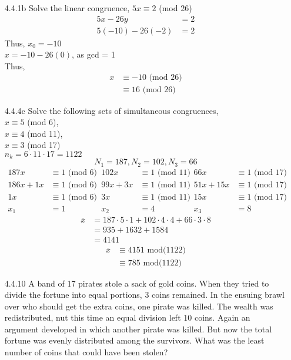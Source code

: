 \documentclass[12pt]{article}
\begin{document}
\begin{enumerate}
	\item[4.4.1b] Solve the linear congruence, $ 5x\equiv 2 $ (mod 26)
	\begin{align*}
		5x-26y&=2\\
		5(-10)-26(-2)&=2
	\end{align*}
	Thus, $ x_0 = -10 $\\
	$ x = -10 - 26(0) $, as gcd = 1\\
	Thus, \begin{align*}
		x &\equiv -10 \text { (mod 26)}\\
		  &\equiv 16 \text{ (mod 26)}
	\end{align*}
	\item[4.4.4c] Solve the following sets of simultaneous congruences, \\$ x \equiv 5 $ (mod 6),\\$ x \equiv 4 $ (mod 11),\\$ x \equiv 3 $ (mod 17) \\
	$ n_k = 6\cdot11\cdot17=1122 $
	\[	N_1 = 187,
		N_2 = 102,
		N_3 = 66\]
	\begin{align*}
		187x&\equiv 1 \text{ (mod 6)} & 102x&\equiv 1 \text{ (mod 11)} & 66x&\equiv 1 \text{ (mod 17)}\\
		186x+1x&\equiv 1 \text{ (mod 6)} & 99x+3x&\equiv 1 \text{ (mod 11)} & 		51x+15x&\equiv 1 \text{ (mod 17)}\\
		1x&\equiv 1 \text{ (mod 6)} & 3x&\equiv 1 \text{ (mod 11)} & 15x&\equiv 1 \text{ (mod 17)}\\
		x_1 &= 1 & x_2 &= 4 & x_3 &= 8
	\end{align*}
	\begin{align*}
	\bar{x} &= 187\cdot 5\cdot 1 + 102\cdot 4\cdot 4 + 66\cdot 3 \cdot 8\\
		   &= 935 + 1632 + 1584\\
		   &= 4141
	\end{align*}
	\begin{align*}
		\bar{x} &\equiv 4151 \text{ mod(1122)}\\
				&\equiv 785 \text { mod(1122)}
	\end{align*}
	\item[4.4.10] A band of 17 pirates stole a sack of gold coins. When they tried to divide the fortune into equal portions, 3 coins remained. In the ensuing brawl over who should get the extra coins, one pirate was killed. The wealth was redistributed, nut this time an equal division left 10 coins. Again an argument developed in which another pirate was killed. But now the total fortune was evenly distributed among the survivors. What was the least number of coins that could have been stolen?

\end{enumerate}
\end{document}
